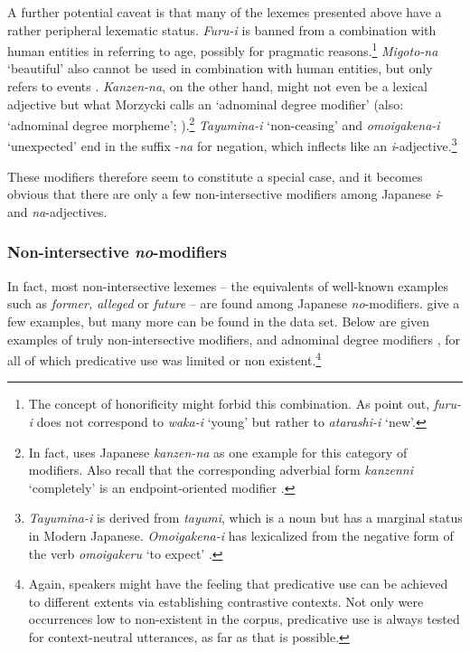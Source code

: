 A further potential caveat is that many of the lexemes presented above have a rather peripheral lexematic status. \textit{Furu-i} is banned from a combination with human entities in referring to age, possibly for pragmatic reasons.\footnote{The concept of honorificity might forbid this combination. As \citet[123]{nagano:2015:RA} point out, \textit{furu-i} does not correspond to \textit{waka-i} `young' but rather to \textit{atarashi-i} `new'.} \textit{Migoto-na} `beautiful' also cannot be used in combination with human entities, but only refers to events \citep[786]{watanabe:2017:attributive}. \textit{Kanzen-na}, on the other hand, might not even be a lexical adjective but what Morzycki calls an `adnominal degree modifier' (also: `adnominal degree morpheme'; \citealt{morzycki:2009:degree, morzycki:2012:adj, morzycki:2012:faces}).\footnote{In fact, \citet{morzycki:2014:where} uses Japanese \textit{kanzen-na} as one example for this category of modifiers. Also recall that the corresponding adverbial form \textit{kanzenni} `completely' is an endpoint-oriented modifier \citep{oshima:2019:gradability}.} \textit{Tayumina-i} `non-ceasing' and \textit{omoigakena-i} `unexpected' end in the suffix -\textit{na} for negation, which inflects like an \textit{i}-adjective.\footnote{\textit{Tayumina-i} is derived from \textit{tayumi}, which is a noun but has a marginal status in Modern Japanese. \textit{Omoigakena-i} has lexicalized from the negative form of the verb \textit{omoigakeru} `to expect’ \citep[803]{watanabe:2017:attributive}.}

These modifiers therefore seem to constitute a special case, and it becomes obvious that there are only a few non-intersective modifiers among Japanese \textit{i}- and \textit{na}-adjectives.

\subsubsection{Non-intersective \textit{no}-modifiers}

In fact, most non-intersective lexemes -- the equivalents of well-known examples such as \textit{former, alleged} or \textit{future} -- are found among Japanese \textit{no}-modifiers. \citet[122]{nagano:2015:RA} give a few examples, but many more can be found in the data set. Below are given examples of truly non-intersective modifiers, and adnominal degree modifiers \citep{morzycki:2014:where}, for all of which predicative use was limited or non existent.\footnote{Again, speakers might have the feeling that predicative use can be achieved to different extents via establishing contrastive contexts. Not only were occurrences low to non-existent in the corpus, predicative use is always tested for context-neutral utterances, as far as that is possible.}


